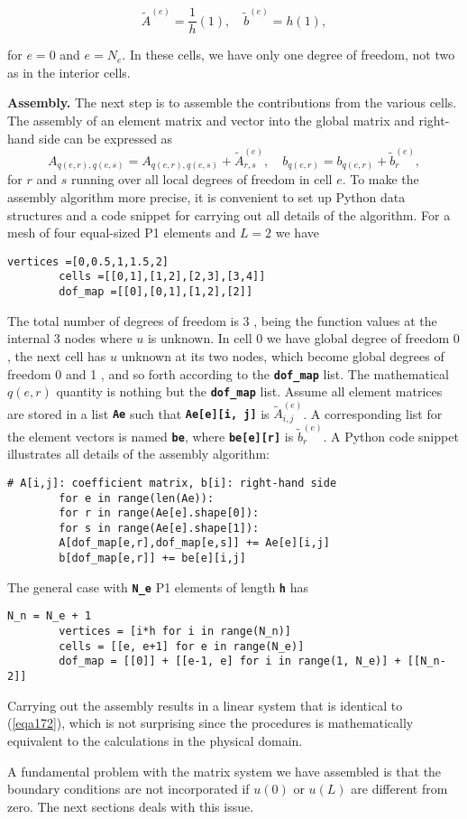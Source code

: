 \documentclass[../main.tex]{subfiles}
\begin{document}
	\begin{equation}
		\label{eqa178}
		\tilde{A}^{(e)}=\frac{1}{h}(1), \quad \tilde{b}^{(e)}=h(1),
	\end{equation}

	for $e=0$ and $e=N_{e}$. In these cells, we have only one degree of freedom, not two as in the interior cells.\bigbreak
	
	\noindent \textbf{Assembly.   } The next step is to assemble the contributions from the various cells. The assembly of an element matrix and vector into the global matrix and right-hand side can be expressed as
	$$
	A_{q(e, r), q(e, s)}=A_{q(e, r), q(e, s)}+\tilde{A}_{r, s}^{(e)}, \quad b_{q(e, r)}=b_{q(e, r)}+\tilde{b}_{r}^{(e)},
	$$
	for $r$ and $s$ running over all local degrees of freedom in cell $e$.\smallbreak
	To make the assembly algorithm more precise, it is convenient to set up Python data structures and a code snippet for carrying out all details of the algorithm. For a mesh of four equal-sized P1 elements and $L=2$ we have
	\begin{lstlisting}[numbers=none]
		vertices =[0,0.5,1,1.5,2]
		cells =[[0,1],[1,2],[2,3],[3,4]]
		dof_map =[[0],[0,1],[1,2],[2]]
	\end{lstlisting}
	The total number of degrees of freedom is 3 , being the function values at the internal 3 nodes where $u$ is unknown. In cell 0 we have global degree of freedom 0 , the next cell has $u$ unknown at its two nodes, which become global degrees of freedom 0 and 1 , and so forth according to the \textbf{\texttt{dof\_map}} list. The mathematical $q(e, r)$ quantity is nothing but the \textbf{\texttt{dof\_map}} list.
	Assume all element matrices are stored in a list \textbf{\texttt{Ae}} such that \textbf{\texttt{Ae[e][i, j]}} is $\tilde{A}_{i, j}^{(e)}$. A corresponding list for the element vectors is named \textbf{\texttt{be}}, where \textbf{\texttt{be[e][r]}} is $\tilde{b}_{r}^{(e)}$. A Python code snippet illustrates all details of the assembly algorithm:
	\begin{lstlisting}[numbers=none]
		# A[i,j]: coefficient matrix, b[i]: right-hand side
		for e in range(len(Ae)):
		for r in range(Ae[e].shape[0]):
		for s in range(Ae[e].shape[1]):
		A[dof_map[e,r],dof_map[e,s]] += Ae[e][i,j]
		b[dof_map[e,r]] += be[e][i,j]
	\end{lstlisting}
	
	The general case with \textbf{\texttt{N\_e}} P1 elements of length \textbf{\texttt{h}} has
	\begin{lstlisting}[numbers=none]
		N_n = N_e + 1
		vertices = [i*h for i in range(N_n)]
		cells = [[e, e+1] for e in range(N_e)]
		dof_map = [[0]] + [[e-1, e] for i in range(1, N_e)] + [[N_n-2]]
	\end{lstlisting} \smallbreak
	Carrying out the assembly results in a linear system that is identical to (\ref{eqa172}), which is not surprising since the procedures is mathematically equivalent to the calculations in the physical domain.
	
	A fundamental problem with the matrix system we have assembled is that the boundary conditions are not incorporated if $u(0)$ or $u(L)$ are different from zero. The next sections deals with this issue.

\clearpage
\end{document}
